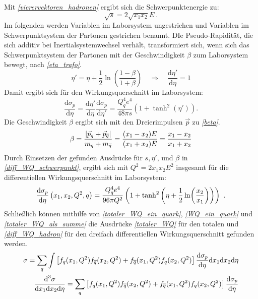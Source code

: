 Mit \textit{\autoref{vierervektoren_hadronen}} ergibt sich die Schwerpunktenergie zu:
\begin{equation}
\sqrt{s} = 2\sqrt{x_1x_2}E~.
\end{equation}
Im folgenden werden Variablen im Laborsystem ungestrichen und Variablen im Schwerpunktsystem der Partonen gestrichen benannt. DIe Pseudo-Rapidität, die sich additiv bei Inertialsystemwechsel verhält, transformiert sich, wenn sich das Schwerpunktsystem der Partonen mit der Geschwindigkeit $\beta$ zum Laborsystem bewegt, nach \textit{\autoref{eta_trafo}}.
\begin{equation}
\eta' = \eta + \frac{1}{2}\ln(\frac{1-\beta}{1+\beta}) \quad \Rightarrow \quad \frac{\text{d}\eta'}{\text{d}\eta} = 1 
\label{eta_trafo}
\end{equation}
Damit ergibt sich für den Wirkungsquerschnitt im Laborsystem: 
\begin{equation}
\frac{\text{d}\sigma_p}{\text{d}\eta} = \frac{\text{d}\eta'}{\text{d}\eta} \frac{\text{d}\sigma_p}{\text{d}\eta'} = \frac{Q_q^4e^4}{48\pi s}(1+\tanh^2(\eta')).
\label{diff_WQ_schwerpunkt}
\end{equation}
Die Geschwindigkeit $\beta$ ergibt sich mit den Dreierimpulsen $\vec{p}$ zu \textit{\autoref{beta}}.
\begin{equation}
\beta = \frac{\abs{\vec{p}_q + \vec{p}_{\overline{q}}}}{m_q + m_{\overline{q}}} = \frac{(x_1 - x_2)E}{(x_1 + x_2)E} = \frac{x_1 - x_2}{x_1 + x_2}
\label{beta}
\end{equation}
Durch Einsetzen der gefunden Ausdrücke für $s, \eta'$, und $\beta$ in \textit{\autoref{diff_WQ_schwerpunkt}}, ergibt sich mit $Q^2 = 2 x_1 x_2 E^2$ insgesamt für die differentiellen Wirkungsquerschnitt im Laborsystem:
\begin{equation}
\derivative{\sigma_p}{\eta}\left(x_1, x_2, Q^2, q\right) = \frac{Q_q^4e^4}{96\pi Q^2} \left(1+\tanh^2\left(\eta + \frac{1}{2}\ln(\frac{x_2}{x_1})\right)\right)~.
\label{diff_WQ_labor}
\end{equation}
Schließlich können mithilfe von \textit{\autoref{totaler_WQ_ein_quark}}, \textit{\autoref{WQ_ein_quark}} und \textit{\autoref{totaler_WQ_als_summe}} die Ausdrücke \textit{\autoref{totaler_WQ}} für den totalen und \textit{\autoref{diff_WQ_hadron}} für den dreifach differentiellen Wirkungsquerschnitt gefunden werden.
\begin{align}
\label{totaler_WQ}
\sigma = \sum_{q} \int \left[f_q(x_1, Q^2)f_{\overline{q}}(x_2, Q^2) +f_{\overline{q}}(x_1, Q^2)f_{q}(x_2, Q^2) \right] \derivative{\sigma_p}{\eta} \text{d}x_1\text{d}x_2\text{d}\eta \\
\frac{\text{d}^3\sigma}{\text{d}x_1\text{d}x_2\text{d}\eta} = \sum_{q} \left[f_q(x_1, Q^2)f_{\overline{q}}(x_2, Q^2) +f_{\overline{q}}(x_1, Q^2)f_{q}(x_2, Q^2) \right] \derivative{\sigma_p}{\eta}
\label{diff_WQ_hadron} 
\end{align}
